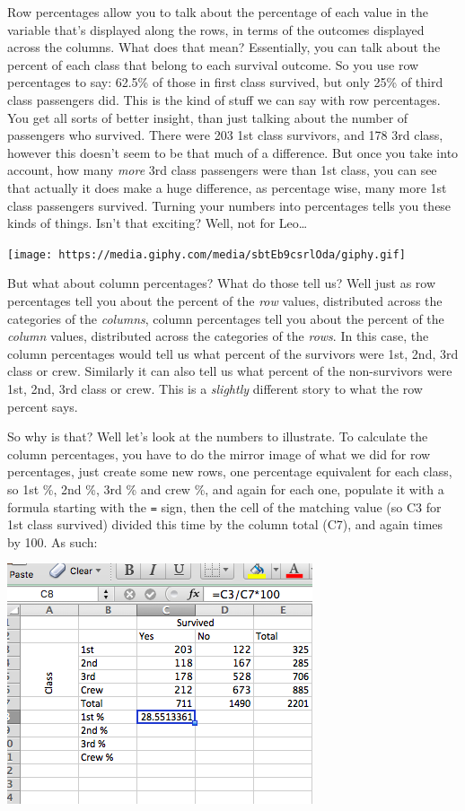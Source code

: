 \documentclass[]{book}
\theoremstyle{definition}
\theoremstyle{definition}
\theoremstyle{definition}
\theoremstyle{remark}
\begin{document}
Row percentages allow you to talk about the percentage of each value in
the variable that's displayed along the rows, in terms of the outcomes
displayed across the columns. What does that mean? Essentially, you can
talk about the percent of each class that belong to each survival
outcome. So you use row percentages to say: 62.5\% of those in first
class survived, but only 25\% of third class passengers did. This is the
kind of stuff we can say with row percentages. You get all sorts of
better insight, than just talking about the number of passengers who
survived. There were 203 1st class survivors, and 178 3rd class, however
this doesn't seem to be that much of a difference. But once you take
into account, how many \emph{more} 3rd class passengers were than 1st
class, you can see that actually it does make a huge difference, as
percentage wise, many more 1st class passengers survived. Turning your
numbers into percentages tells you these kinds of things. Isn't that
exciting? Well, not for Leo\ldots{}

\texttt{[image: https://media.giphy.com/media/sbtEb9csrlOda/giphy.gif]}

But what about column percentages? What do those tell us? Well just as
row percentages tell you about the percent of the \emph{row} values,
distributed across the categories of the \emph{columns}, column
percentages tell you about the percent of the \emph{column} values,
distributed across the categories of the \emph{rows}. In this case, the
column percentages would tell us what percent of the survivors were 1st,
2nd, 3rd class or crew. Similarly it can also tell us what percent of
the non-survivors were 1st, 2nd, 3rd class or crew. This is a
\emph{slightly} different story to what the row percent says.

So why is that? Well let's look at the numbers to illustrate. To
calculate the column percentages, you have to do the mirror image of
what we did for row percentages, just create some new rows, one
percentage equivalent for each class, so 1st \%, 2nd \%, 3rd \% and crew
\%, and again for each one, populate it with a formula starting with the
\texttt{=} sign, then the cell of the matching value (so C3 for 1st
class survived) divided this time by the column total (C7), and again
times by 100. As such:

\includegraphics{imgs/col_perc_calc.png}
\end{document}

